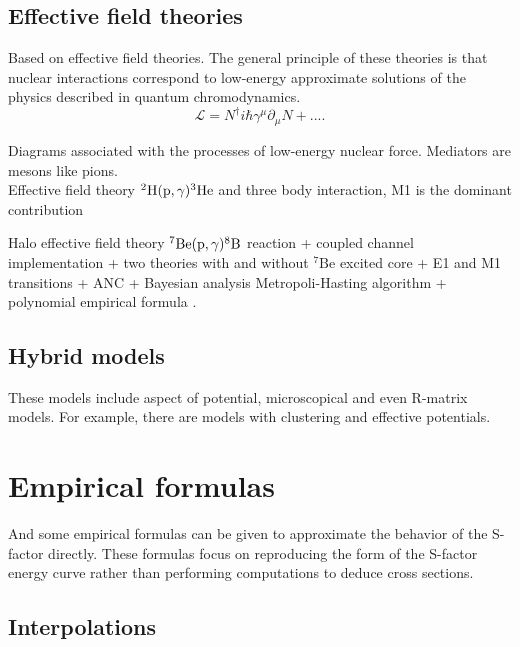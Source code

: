 \documentclass[openany]{book}
\begin{document}
\subsection{Effective field theories} \label{sub:special_effectiveField}

Based on effective field theories. The general principle of these theories is that nuclear interactions correspond to low-energy approximate solutions of the physics described in quantum chromodynamics. \\

\begin{equation} \label{eq:micro_lagrangian_nucleons}
	\mathcal{L} = N^{\dagger}i\hbar\gamma^\mu\partial_\mu N + ... .
\end{equation}

Diagrams associated with the processes of low-energy nuclear force. Mediators are mesons like pions. \\

Effective field theory $\mathrm{{}^{2}H(p, \gamma){}^{3}He}$ and three body interaction, M1 is the dominant contribution \cite{sadeghi_khalili_godarzi_2013}

 Halo effective field theory $\mathrm{{}^{7}Be(p, \gamma){}^{8}B}$ reaction + coupled channel implementation + two theories with and without $\mathrm{{}^{7}Be}$ excited core  + E1 and M1 transitions + ANC + Bayesian analysis Metropoli-Hasting algorithm + polynomial empirical formula  \cite{higa_premarathna_rupak_2022}.

\subsection{Hybrid models} \label{sub:special_hybrid}

These models include aspect of potential, microscopical and even R-matrix models. For example, there are models with clustering and effective potentials.

\section{Empirical formulas} \label{sec:empiricalFormulas}

And some empirical formulas can be given to approximate the behavior of the S-factor directly. These formulas focus on reproducing the form of the S-factor energy curve rather than performing computations to deduce cross sections.

\subsection{Interpolations} \label{sub:empirical_interpolation}
\end{document}
